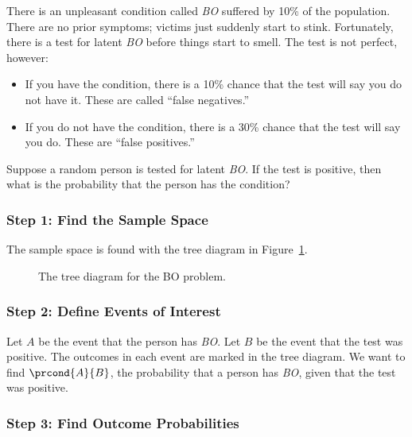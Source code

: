 There is an unpleasant condition called \emph{BO} suffered by 10\% of the
population.  There are no prior symptoms; victims just suddenly start to
stink.  Fortunately, there is a test for latent \emph{BO} before things
start to smell.  The test is not perfect, however:
\begin{itemize}

\item If you have the condition, there is a 10\% chance that the test
  will say you do not have it.  These are called ``false negatives.''

\item If you do not have the condition, there is a 30\% chance that the test
will say you do.  These are ``false positives.''

\end{itemize}

Suppose a random person is tested for latent \emph{BO}.  If the test is
positive, then what is the probability that the person has the condition?

\subsubsection*{Step 1: Find the Sample Space}

The sample space is found with the tree diagram in
Figure~\ref{fig:15C1}.

\begin{figure}[h]


\caption{The tree diagram for the BO problem.}

\label{fig:15C1}

\end{figure}

\subsubsection*{Step 2: Define Events of Interest}

Let $A$ be the event that the person has \emph{BO}.  Let $B$ be the
event that the test was positive.  The outcomes in each event are marked
in the tree diagram.  We want to find $\prcond{A}{B}$, the probability
that a person has \emph{BO}, given that the test was positive.

\subsubsection*{Step 3: Find Outcome Probabilities}

